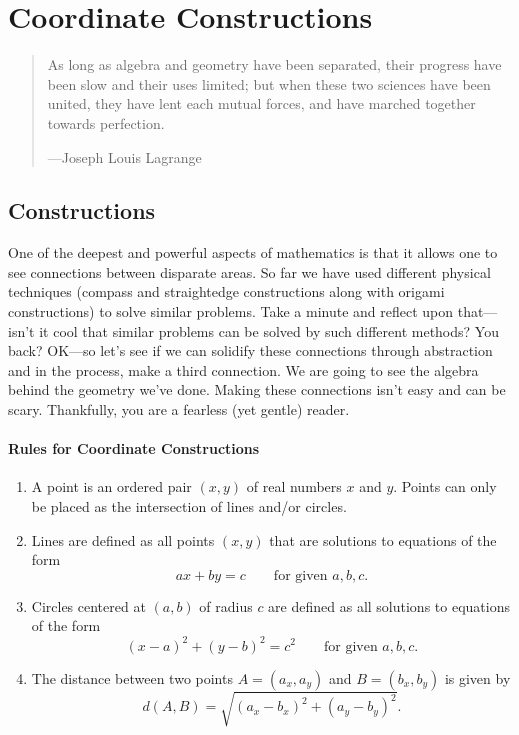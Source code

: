 \chapter{Coordinate Constructions}
\begin{quote} 
As long as algebra and geometry have been separated, their progress
have been slow and their uses limited; but when these two sciences
have been united, they have lent each mutual forces, and have marched
together towards perfection.


\hfill---Joseph Louis Lagrange
\end{quote}

\section{Constructions}

One of the deepest and powerful aspects of mathematics is that it
allows one to see connections between disparate areas. So far we have
used different physical techniques (compass and straightedge
constructions along with origami constructions) to solve similar
problems. Take a minute and reflect upon that---isn't it cool that
similar problems can be solved by such different methods?  You back?
OK---so let's see if we can solidify these connections through
abstraction and in the process, make a third connection. We are going
to see the algebra behind the geometry we've done. Making these
connections isn't easy and can be scary. Thankfully, you are a
fearless (yet gentle) reader.




\subsubsection{Rules for Coordinate Constructions}

\begin{enumerate}
\item A point is an ordered pair $(x,y)$ of real numbers $x$ and
  $y$. Points can only be placed as the intersection of lines and/or
  circles.
\item Lines are defined as all points $(x,y)$ that are solutions to
  equations of the form
\[
ax + by = c \qquad \text{for given $a,b,c$.}
\]
\item Circles centered at $(a,b)$ of radius $c$ are defined as all
  solutions to equations of the form
\[
(x-a)^2 + (y-b)^2 = c^2 \qquad \text{for given $a,b,c$.}
\]
\item The distance between two points $A = (a_x,a_y)$ and $B =
  (b_x,b_y)$ is given by
\[
d(A,B) = \sqrt{(a_x-b_x)^2 + (a_y - b_y)^2}.
\]
\end{enumerate}



